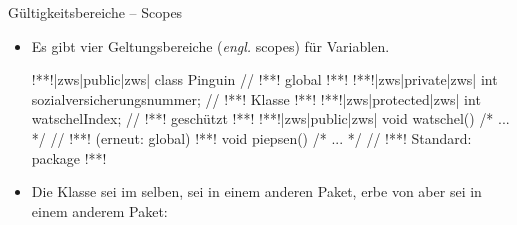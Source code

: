 \begin{frame}[fragile]{Gültigkeitsbereiche -- Scopes}
    \begin{itemize}[<+(1)->]
        \item Es gibt vier Geltungsbereiche (\textit{engl.} scopes) für Variablen.
\begin{plainjava}[language=xJava]
!**!|zws|public|zws| class Pinguin { // !**! global
!**!    !**!|zws|private|zws| int sozialversicherungsnummer; // !**! Klasse
!**!    !**!|zws|protected|zws| int watschelIndex; // !**! geschützt
!**!    !**!|zws|public|zws| void watschel() { /* ... */ } // !**! (erneut: global)
!**!    void piepsen() { /* ... */ } // !**! Standard: package
!**!}
\end{plainjava}
    \item<8-> Die Klasse  sei im selben,  sei in einem anderen Paket,  erbe von  aber sei in einem anderem Paket: \medskip\par
    \end{itemize}
\end{frame}

